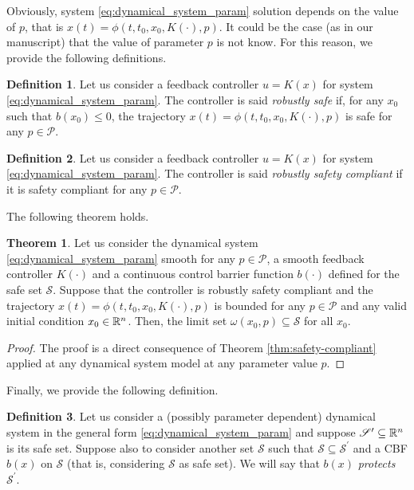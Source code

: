 \documentclass[letterpaper, 10 pt, conference]{ieeeconf}
\newcounter{Definition}
\theoremstyle{definition}
\theoremstyle{nopoint}
\newtheorem{definitionNoPoint}{Definition}
\newtheorem{theorem}{Theorem}[section]
\newcounter{Theorem}
\begin{document}
Obviously, system \eqref{eq:dynamical_system_param} solution depends on the value of $p$, that is  $x(t)=\phi(t,t_0,x_0,K(\cdot),p)$.
It could be the case (as in our manuscript) that the value of parameter $p$ is not know. For this reason,
we provide the following definitions. 

\begin{definitionNoPoint}
Let us consider a feedback controller $u=K(x)$ for system  \eqref{eq:dynamical_system_param}.
The controller is said {\em robustly safe} if, for any $x_0$ such that $b(x_0)\leq 0$, the trajectory  $x(t)=\phi(t,t_0,x_0,K(\cdot),p)$ is safe for any $p\in \mathcal{P}$.
\end{definitionNoPoint}


\begin{definitionNoPoint}
Let us consider a feedback controller $u=K(x)$ for system  \eqref{eq:dynamical_system_param}.
The controller is said {\em robustly safety compliant} if it is safety compliant for any $p\in \mathcal{P}$.
\end{definitionNoPoint}


The following theorem holds.

\begin{theorem} \label{lemma:safety-enforcing-robust}
Let us consider the dynamical system  \eqref{eq:dynamical_system_param} smooth for any $p\in\mathcal{P}$, a smooth feedback controller $K(\cdot)$ and a continuous control barrier function $b(\cdot)$ defined for the safe set $\mathcal{S}$. 
Suppose that the controller is robustly safety compliant and the trajectory
$x(t)=\phi(t,t_0,x_0,K(\cdot),p)$ is bounded for any $p\in\mathcal{P}$ and any valid initial condition $x_0\in\Bbb{R}^n$. Then, the limit set $\omega(x_0,p)\subseteq \mathcal{S}$ for all $x_0$.

\begin{proof}
The proof is a direct consequence of Theorem \ref{thm:safety-compliant} applied at any dynamical system model at any parameter value $p$.
\end{proof}
\end{theorem}


Finally, we provide the following definition. 

\begin{definitionNoPoint}\label{def:protecting_barrier}
Let us consider a (possibly parameter dependent) dynamical system in the general form \eqref{eq:dynamical_system_param} and suppose $\mathcal{S}^\prime\subseteq \Bbb{R}^n$ is its safe set. Suppose also to consider another set $\mathcal{S}$ such that $\mathcal{S}\subseteq \mathcal{S}^\prime$ and a CBF $b(x)$ on $\mathcal{S}$ (that is, considering $\mathcal{S}$ as safe set). We will say that $b(x)$ {\em protects} $\mathcal{S}^\prime$.
\end{definitionNoPoint}
\end{document}
